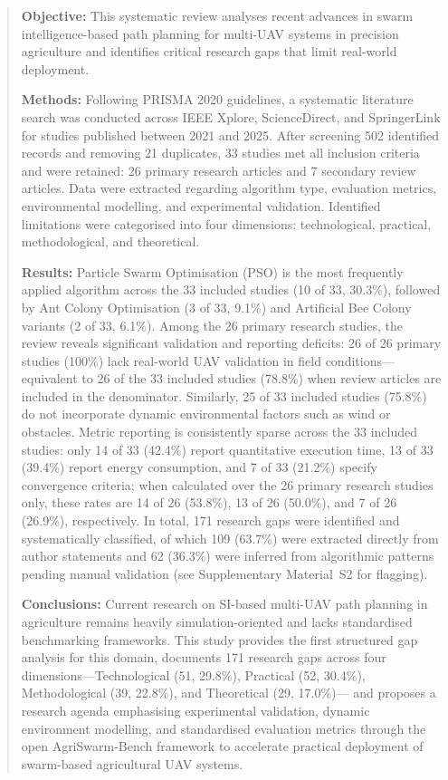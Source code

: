 \documentclass[review,3p,times]{elsarticle}
\begin{document}
\begin{frontmatter}
\begin{abstract}
\textbf{Objective:} This systematic review analyses recent advances in swarm
intelligence-based path planning for multi-UAV systems in precision agriculture and
identifies critical research gaps that limit real-world deployment.

\textbf{Methods:} Following PRISMA 2020 guidelines, a systematic literature search
was conducted across IEEE Xplore, ScienceDirect, and SpringerLink for studies
published between 2021 and 2025. After screening 502 identified records and removing
21 duplicates, 33 studies met all inclusion criteria and were retained: 26 primary
research articles and 7 secondary review articles. Data were extracted regarding
algorithm type, evaluation metrics, environmental modelling, and experimental
validation. Identified limitations were categorised into four dimensions:
technological, practical, methodological, and theoretical.

\textbf{Results:} Particle Swarm Optimisation (PSO) is the most frequently applied
algorithm across the 33 included studies (10 of 33, 30.3\%), followed by Ant Colony
Optimisation (3 of 33, 9.1\%) and Artificial Bee Colony variants (2 of 33, 6.1\%).
Among the 26 primary research studies, the review reveals significant validation and
reporting deficits: 26 of 26 primary studies (100\%) lack real-world UAV validation
in field conditions---equivalent to 26 of the 33 included studies (78.8\%) when
review articles are included in the denominator. Similarly, 25 of 33 included studies
(75.8\%) do not incorporate dynamic environmental factors such as wind or obstacles.
Metric reporting is consistently sparse across the 33 included studies: only 14 of
33 (42.4\%) report quantitative execution time, 13 of 33 (39.4\%) report energy
consumption, and 7 of 33 (21.2\%) specify convergence criteria; when calculated
over the 26 primary research studies only, these rates are 14 of 26 (53.8\%), 13 of
26 (50.0\%), and 7 of 26 (26.9\%), respectively. In total, 171 research gaps were identified and systematically classified, of which 109 (63.7\%) were extracted directly from author statements and 
62 (36.3\%) were inferred from algorithmic patterns pending manual validation 
(see Supplementary Material~S2 for flagging).

\textbf{Conclusions:} Current research on SI-based multi-UAV path planning in
agriculture remains heavily simulation-oriented and lacks standardised benchmarking
frameworks. This study provides the first structured gap analysis for this domain,
documents 171 research gaps across four dimensions---Technological (51, 29.8\%),
Practical (52, 30.4\%), Methodological (39, 22.8\%), and Theoretical (29, 17.0\%)---
and proposes a research agenda emphasising experimental validation, dynamic
environment modelling, and standardised evaluation metrics through the open
AgriSwarm-Bench framework to accelerate practical deployment of swarm-based
agricultural UAV systems.
\end{abstract}


\end{frontmatter}
\end{document}
